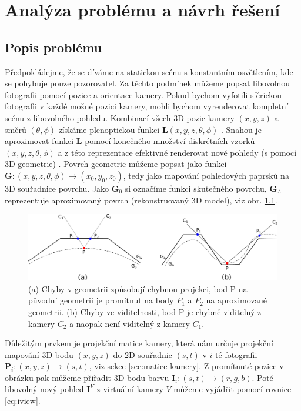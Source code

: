 \documentclass[11pt,twoside,a4paper]{book}
\begin{document}
\chapter{Analýza problému a návrh řešení}
\label{chap:analysis}
\section{Popis problému}

Předpokládejme, že se díváme na statickou scénu s konstantním osvětlením, kde se pohybuje pouze pozorovatel. Za těchto podmínek můžeme popsat libovolnou fotografii pomocí pozice a orientace kamery. Pokud bychom vyfotili sférickou fotografii v každé možné pozici kamery, mohli bychom vyrenderovat kompletní scénu z libovolného pohledu. Kombinací všech 3D pozic kamery $(x, y, z)$ a směrů $(\theta, \phi)$ získáme plenoptickou funkci $\textbf{L}(x, y, z, \theta, \phi)$ \cite{Adelson91}. Snahou je aproximovat funkci \textbf{L} pomocí konečného množství diskrétních vzorků $(x, y, z, \theta, \phi)$ a z této reprezentace efektivně renderovat nové pohledy (s pomocí 3D geometrie) \cite{floating-textures}. Povrch geometrie můžeme popsat jako funkci $\textbf{G} : (x, y, z, \theta, \phi) \to (x_0, y_0, z_0)$, tedy jako mapování pohledových paprsků na 3D souřadnice povrchu. Jako $\textbf{G}_0$ si označíme funkci skutečného povrchu, $\textbf{G}_A$  reprezentuje aproximovaný povrch (rekonstruovaný 3D model), viz obr. \ref{fig:projection-error}.

\begin{figure}[hb]
\begin{center}
\includegraphics[width=\textwidth]{figures/projection-error}
\caption{(a) Chyby v geometrii způsobují chybnou projekci, bod P na původní geometrii je promítnut na body $P_1$ a $P_2$ na aproximované geometrii. (b) Chyby ve viditelnosti, bod P je chybně viditelný z kamery $C_2$ a naopak není viditelný z kamery $C_1$.}
\label{fig:projection-error}
\end{center}
\end{figure}

Důležitým prvkem je projekční matice kamery, která nám určuje projekční mapování 3D bodu $(x, y, z)$ do 2D souřadnic $(s, t)$ v $i$-té fotografii  $\textbf{P}_i: (x, y, z) \to (s, t)$, viz sekce \ref{sec:matice-kamery}.  Z promítnuté pozice v obrázku pak můžeme přiřadit 3D bodu barvu $\textbf{I}_i : (s, t) \to (r, g, b)$. Poté libovolný nový pohled $\textbf{I}^V$ z virtuální kamery $V$ můžeme vyjádřit pomocí rovnice \ref{eq:iview}.
\end{document}
